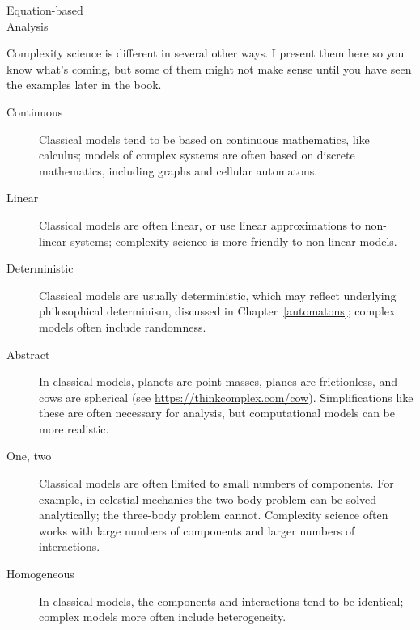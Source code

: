 \documentclass[12pt]{book}
\theoremstyle{exercise}
\newcommand{\myrightarrow}{\ensuremath \rightarrow}
\begin{document}
\begin{description}

\item[Equation-based \myrightarrow~simulation-based] \quad

\item[Analysis \myrightarrow~computation] \quad

\end{description}

Complexity science is different in several other ways.  I present them
here so you know what's coming, but some of them might not make sense
until you have seen the examples later in the book.

\begin{description}

\item[Continuous \myrightarrow~discrete] Classical models tend to be
  based on continuous mathematics, like calculus; models of complex
  systems are often based on discrete mathematics, including graphs and
  cellular automatons.


\item[Linear \myrightarrow~non-linear] Classical models are often
  linear, or use linear approximations to non-linear systems;
  complexity science is more friendly to non-linear models.


\item[Deterministic \myrightarrow~stochastic] Classical models are
  usually deterministic, which may reflect underlying philosophical
  determinism, discussed in Chapter~\ref{automatons}; complex models
  often include randomness.


\item[Abstract \myrightarrow~detailed] In classical models, planets are
  point masses, planes are frictionless, and cows are
  spherical (see \url{https://thinkcomplex.com/cow}).
  Simplifications like these are often necessary for analysis,
  but computational models can be more realistic.


\item[One, two \myrightarrow~many] Classical models are often limited to
  small numbers of components.  For example, in celestial mechanics the
  two-body problem can be solved analytically; the three-body problem
  cannot.  Complexity science often works with large numbers of components and larger numbers of interactions.


\item[Homogeneous \myrightarrow~heterogeneous] In classical models, the
  components and interactions tend to be identical; complex models more often
  include heterogeneity.


\end{description}
\end{document}
